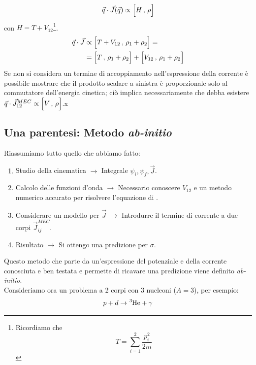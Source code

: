 $$\vec{q}\cdot\vec{J}(\vec{q}) \propto \Bigl [ H\,,\,\rho \Bigr ]$$
con $H = T+V_{12}$\footnote{Ricordiamo che %
$$T=\sum_{i=1}^2 \frac{p_i^2}{2m}$$%
}.
\begin{displaymath}
\begin{aligned}
\vec{q}\cdot\vec{J}&\propto \Bigl [ T+V_{12}\,,\,\rho_1+\rho_2 \Bigr ] = \\
&= \Bigl [ T\,,\,\rho_1+\rho_2 \Bigr ] + \Bigl [ V_{12}\,,\,\rho_1+\rho_2 \Bigr ]
\end{aligned}
\end{displaymath}
Se non si considera un termine di accoppiamento nell'espressione della corrente è possibile mostrare che il prodotto scalare a sinistra è proporzionale solo al commutatore dell'energia cinetica; ciò implica necessariamente che debba esistere $\vec{q}\cdot\vec{J}_{12}^{MEC}\propto\Bigl [ V\,,\,\rho \Bigr ]$.x
\newpage
\subsection{Una parentesi: Metodo \textit{ab-initio}}\label{0318-sec-abinitio} Riassumiamo tutto quello che abbiamo fatto:
\begin{enumerate}[1]
    \item Studio della cinematica $\to$ Integrale $\psi_i,\psi_f,\vec{J}$.
    \item Calcolo delle funzioni d'onda $\to$ Necessario conoscere $V_{12}$ e un metodo numerico accurato per risolvere l'equazione di \Sch.
    \item Considerare un modello  per $\vec{J}$ $\to$ Introdurre il termine di corrente a due corpi $\vec{J}^{MEC}_{ij}$.
    \item Risultato $\to$ Si ottengo una predizione per $\sigma$.
\end{enumerate}
Questo metodo che parte da un'espressione del potenziale e della corrente conosciuta e ben testata e permette di ricavare una predizione viene definito \textit{ab-initio}.\\
Consideriamo ora un problema a 2 corpi con 3 nucleoni ($A=3$), per esempio:
$$p+d\to \ce{^3He}+\gamma$$
